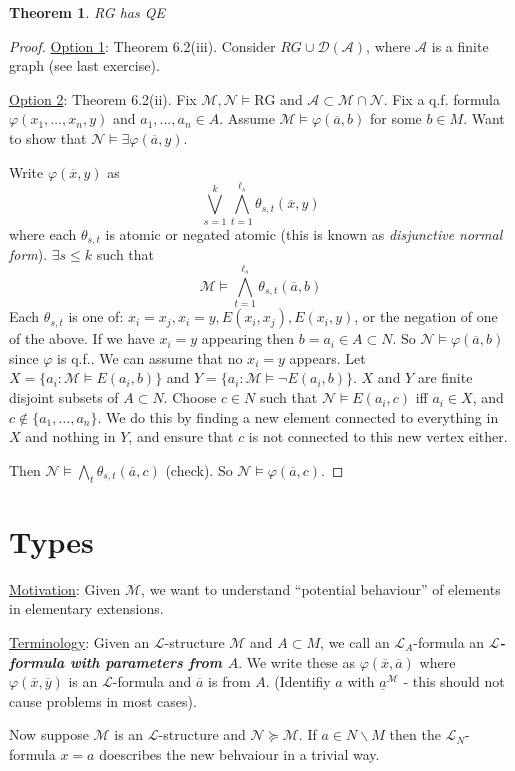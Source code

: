 \documentclass[]{article}
\theoremstyle{custhm}
\newtheorem{theorem}{Theorem}[section]
\theoremstyle{cusdef}
\theoremstyle{custhm}
\theoremstyle{custhm}
\theoremstyle{custhm}
\theoremstyle{ex}
\theoremstyle{custhm}
\theoremstyle{cusdef}
\theoremstyle{remark}
\theoremstyle{remark}
\newcommand{\undf}[1]{\textit{\textbf{#1}}}
\renewcommand{\L}{\mathcal{L}}
\newcommand{\M}{\mathcal{M}}
\renewcommand{\phi}{\varphi}
\renewcommand{\bar}{\overline}
\newcommand{\N}{\mathcal{N}}
\newcommand{\A}{\mathcal{A}}
\newcommand{\D}{\mathcal{D}}
\begin{document}
\begin{theorem}
RG has QE
\end{theorem}
\begin{proof}
\underline{Option 1}: Theorem 6.2(iii). Consider $RG \cup \D(\A)$, where $\A$ is a finite graph (see last exercise).

\underline{Option 2}: Theorem 6.2(ii). Fix $\M,\N\models \textrm{RG}$ and $\A\subset \M\cap \N$. Fix a q.f. formula $\phi(x_1,\dots,x_n,y)$ and $a_1,\dots,a_n\in A$. Assume $\M\models \phi(\bar{a},b)$ for some $b\in M$. Want to show that $\N\models \exists \phi(\bar{a},y)$.

Write $\phi(\bar{x},y)$ as $$\bigvee_{s=1}^{k}\bigwedge_{t=1}^{\ell_s}\theta_{s,t}(\bar{x},y)$$ where each $\theta_{s,t}$ is atomic or negated atomic (this is known as \textit{disjunctive normal form}). $\exists s\le k$ such that $$\M\models\bigwedge_{t=1}^{\ell_s}\theta_{s,t}(\bar{a},b)$$
Each $\theta_{s,t}$ is one of: $x_i = x_j, x_i = y,E(x_i,x_j),E(x_i,y)$, or the negation of one of the above. If we have $x_i = y$ appearing then $b = a_i\in A\subset N$. So $\N \models \phi(\bar{a},b)$ since $\phi$ is q.f.. We can assume that no $x_i = y$ appears. Let $X = \{a_i:\M\models E(a_i,b)\}$ and $Y = \{a_i : \M\models \neg E(a_i,b)\}$. $X$ and $Y$ are finite disjoint subsets of $A\subset N$. Choose $c\in N$ such that $\N\models E(a_i,c)$ iff $a_i \in X$, and $c\not\in\{a_1,\dots,a_n\}$. We do this by finding a new element connected to everything in $X$ and nothing in $Y$, and ensure that $c$ is not connected to this new vertex either.

Then $\N\models \bigwedge_{t}\theta_{s,t}(\bar{a},c)$ (check). So $\N\models \phi(\bar{a},c)$.
\end{proof}

\section{Types}

\underline{Motivation}: Given $\M$, we want to understand ``potential behaviour'' of elements in elementary extensions.

\underline{Terminology}: Given an $\L$-structure $\M$ and $A\subset M$, we call an $\L_A$-formula an \undf{$\L$-formula with parameters from $A$}. We write these as $\phi(\bar{x},\bar{a})$ where $\phi(\bar{x},\bar{y})$ is an $\L$-formula and $\bar{a}$ is from $A$. (Identifiy $a$ with $\underline{a}^\M$ - this should not cause problems in most cases).

Now suppose $\M$ is an $\L$-structure and $\N\succeq\M$. If $a\in N\backslash M$ then the $\L_N$-formula $x = a$ doescribes the new behvaiour in a trivial way.
\end{document}
